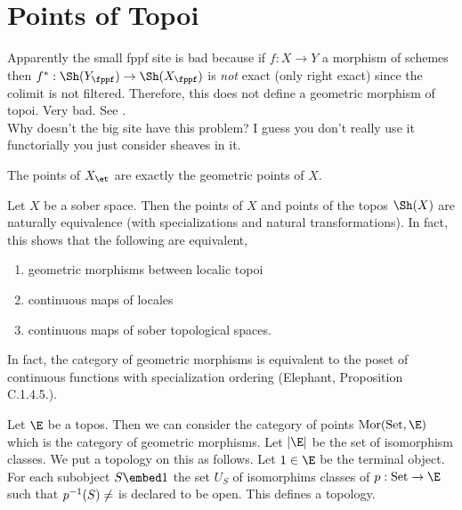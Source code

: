 \documentclass[12pt]{article}
\begin{document}
\section{Points of Topoi}

\begin{rmk}
Apparently the small fppf site is bad because if $f : X \to Y$ a morphism of schemes then $f^* : \Sh(Y_{\fppf}) \to \Sh(X_{\fppf})$ is \textit{not} exact (only right exact) since the colimit is not filtered. Therefore, this does not define a geometric morphism of topoi. Very bad.  See .
\bigskip\\
Why doesn't the big site have this problem? I guess you don't really use it functorially you just consider sheaves in it.
\end{rmk}

\begin{theorem}
The points of $X_{\et}$ are exactly the geometric points of $X$.
\end{theorem} 

\begin{theorem}
Let $X$ be a sober space. Then the points of $X$ and points of the topos $\Sh(X)$ are naturally equivalence (with specializations and natural transformations). In fact, this shows that the following are equivalent,
\begin{enumerate}
\item geometric morphisms between localic topoi
\item continuous maps of locales
\item continuous maps of sober topological spaces.
\end{enumerate}
In fact, the category of geometric morphisms is equivalent to the poset of continuous functions with specialization ordering (Elephant, Proposition C.1.4.5.). 
\end{theorem}

\newcommand{\Mor}{\mathrm{Mor}}
\newcommand{\Set}{\mathrm{Set}}
\newcommand{\Zar}{\mathrm{Zar}}
\newcommand{\reg}{\mathrm{reg}}

\begin{defn}
Let $\E$ be a topos. Then we can consider the category of points $\Mor(\Set, \E)$ which is the category of geometric morphisms. Let $|\E|$ be the set of isomorphism classes. We put a topology on this as follows. Let $1 \in \E$ be the terminal object. For each subobject $S \embed 1$ the set $U_S$ of isomorphims classes of $p : \Set \to \E$ such that $p^{-1}(S) \neq \empty$ is declared to be open. This defines a topology. 
\end{defn}
\end{document}
